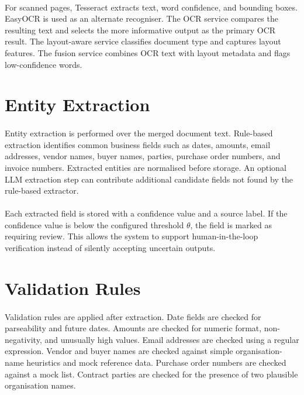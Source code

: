 \paragraph{} For scanned pages, Tesseract extracts text, word confidence, and bounding boxes. EasyOCR is used as an alternate recogniser. The OCR service compares the resulting text and selects the more informative output as the primary OCR result. The layout-aware service classifies document type and captures layout features. The fusion service combines OCR text with layout metadata and flags low-confidence words.

\section{Entity Extraction}
\paragraph{} Entity extraction is performed over the merged document text. Rule-based extraction identifies common business fields such as dates, amounts, email addresses, vendor names, buyer names, parties, purchase order numbers, and invoice numbers. Extracted entities are normalised before storage. An optional LLM extraction step can contribute additional candidate fields not found by the rule-based extractor.

\paragraph{} Each extracted field is stored with a confidence value and a source label. If the confidence value is below the configured threshold \(\theta\), the field is marked as requiring review. This allows the system to support human-in-the-loop verification instead of silently accepting uncertain outputs.

\section{Validation Rules}
\paragraph{} Validation rules are applied after extraction. Date fields are checked for parseability and future dates. Amounts are checked for numeric format, non-negativity, and unusually high values. Email addresses are checked using a regular expression. Vendor and buyer names are checked against simple organisation-name heuristics and mock reference data. Purchase order numbers are checked against a mock list. Contract parties are checked for the presence of two plausible organisation names.

